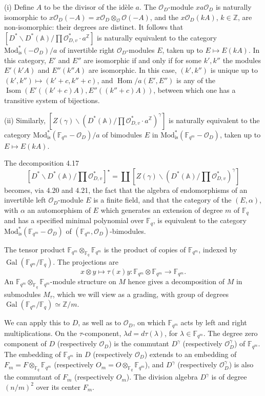 \documentclass[10pt]{article}
\newcommand{\Fq}{\mathbb F_q}
\newcommand{\Fqm}{\mathbb F_{q^m}}
\newcommand{\Z}{\mathbb Z}
\newcommand{\Adele}{\mathbb A}
\newcommand{\Isom}{\operatorname{Isom}}
\newcommand{\Gal}{\operatorname{Gal}}
\newcommand{\Hom}{\operatorname{Hom}}
\newcommand{\OD}{\mathcal O_D}
\newcommand{\OO}{\mathcal O}
\theoremstyle{deligne}
\newcommand{\heading}[1]{\vspace{0.7em}\noindent{\bfseries #1}\quad}
\begin{document}
\heading{Variants 4.22.} (i) Define $A$ to be the divisor of the id\`ele $a$. The $\OD$-module $xa\OD$ is naturally isomorphic to $x\OD(-A)=x\OD\otimes_\OO\OO(-A)$, and the $x\OD(kA)$, $k\in\Z$, are non-isomorphic: their degrees are distinct. It follows that $[D^*\backslash D^*(\Adele)/\prod\mathcal O_{D,v}^*\cdot a^\Z]$ is naturally equivalent to the category $\mathrm{Mod}_{\mathrm{is}}^*(-\OD)/a$ of invertible right $\OD$-modules $E$, taken up to $E\mapsto E(kA)$. In this category, $E'$ and $E''$ are isomorphic if and only if for some $k',k''$ the modules $E'(k'A)$ and $E''(k''A)$ are isomorphic. In this case, $(k',k'')$ is unique up to $(k',k'')\mapsto(k'+c,k''+c)$, and $\Hom/a(E',E'')$ is any of the $\Isom(E'((k'+c)A),E''((k''+c)A))$, between which one has a transitive system of bijections.

(ii) Similarly, $[Z(\gamma)\backslash(D^*(\Adele)/\prod\mathcal O_{D,v}^*\cdot a^\Z)^\gamma]$ is naturally equivalent to the category $\mathrm{Mod}_{\mathrm{is}}^*(\Fqm-\OD)/a$ of bimodules $E$ in $\mathrm{Mod}_{\mathrm{is}}^*(\Fqm-\OD)$, taken up to $E\mapsto E(kA)$.

\heading{Remark 4.23.} The decomposition 4.17
\[
[D^*\backslash D^*(\Adele)/\prod\mathcal O_{D,v}^*]^\star
=\coprod [Z(\gamma)\backslash(D^*(\Adele)/\prod\mathcal O_{D,v}^*)^\gamma]
\]
becomes, via 4.20 and 4.21, the fact that the algebra of endomorphisms of an invertible left $\OD$-module $E$ is a finite field, and that the category of the $(E,\alpha)$, with $\alpha$ an automorphism of $E$ which generates an extension of degree $m$ of $\Fq$ and has a specified minimal polynomial over $\Fq$, is equivalent to the category $\mathrm{Mod}_{\mathrm{is}}^*(\Fqm-\OD)$ of $(\Fqm,\OD)$-bimodules.

\heading{4.24.} The tensor product $\Fqm\otimes_{\Fq}\Fqm$ is the product of copies of $\Fqm$, indexed by $\Gal(\Fqm/\Fq)$. The projections are
\[
x\otimes y\longmapsto \tau(x)y:\Fqm\otimes\Fqm\longrightarrow\Fqm.
\]
An $\Fqm\otimes_{\Fq}\Fqm$-module structure on $M$ hence gives a decomposition of $M$ in submodules $M_\tau$, which we will view as a grading, with group of degrees $\Gal(\Fqm/\Fq)\simeq\Z/m$.

We can apply this to $D$, as well as to $\OD$, on which $\Fqm$ acts by left and right multiplications. On the $\tau$-component, $\lambda d=d\tau(\lambda)$, for $\lambda\in\Fqm$. The degree zero component of $D$ (respectively $\OD$) is the commutant $D^\gamma$ (respectively $\OD^\gamma$) of $\Fqm$. The embedding of $\Fqm$ in $D$ (respectively $\OD$) extends to an embedding of $F_m=F\otimes_{\Fq}\Fqm$ (respectively $O_m=O\otimes_{\Fq}\Fqm$), and $D^\gamma$ (respectively $\OD^\gamma$) is also the commutant of $F_m$ (respectively $O_m$). The division algebra $D^\gamma$ is of degree $(n/m)^2$ over its center $F_m$.
\end{document}
